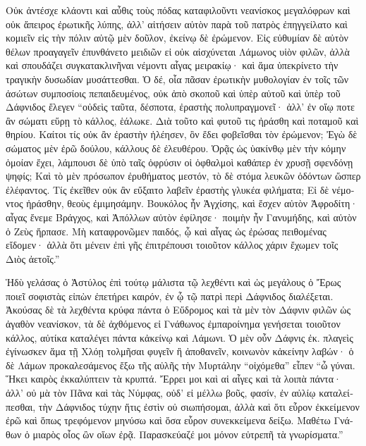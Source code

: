 \documentclass{book}
\begin{document}
\begin{pairs}
\begin{Leftside}
\begin{greek}
  Οὐκ ἀντέσχε κλάοντι καὶ αὖθις τοὺς πόδας καταφιλοῦντι νεανίσκος μεγαλόφρων καὶ οὐκ ἄπειρος ἐρωτικῆς λύπης, ἀλλ’ αἰτήσειν αὐτὸν παρὰ τοῦ πατρὸς ἐπηγγείλατο καὶ κομιεῖν εἰς τὴν πόλιν αὑτῷ μὲν δοῦλον, ἐκείνῳ δὲ ἐρώμενον.  Εἰς εὐθυμίαν δὲ αὐτὸν θέλων προαγαγεῖν ἐπυνθάνετο μειδιῶν εἰ οὐκ αἰσχύνεται Λάμωνος υἱὸν φιλῶν, ἀλλὰ καὶ σπουδάζει συγκατακλινῆναι νέμοντι αἶγας μειρακίῳ· καὶ ἅμα ὑπεκρίνετο τὴν τραγικὴν δυσωδίαν μυσάττεσθαι.  Ὁ δέ, οἷα πᾶσαν ἐρωτικὴν μυθολογίαν ἐν τοῖς τῶν ἀσώτων συμποσίοις πεπαιδευμένος, οὐκ ἀπὸ σκοποῦ καὶ ὑπὲρ αὑτοῦ καὶ ὑπὲρ τοῦ Δάφνιδος ἔλεγεν “οὐδεὶς ταῦτα, δέσποτα, ἐραστὴς πολυπραγμονεῖ· ἀλλ’ ἐν οἵῳ ποτε ἂν σώματι εὕρῃ τὸ κάλλος,  ἑάλωκε. Διὰ τοῦτο καὶ φυτοῦ τις ἠράσθη καὶ ποταμοῦ καὶ θηρίου. Καίτοι τίς οὐκ ἂν ἐραστὴν ἠλέησεν, ὃν ἔδει φοβεῖσθαι τὸν ἐρώμενον; Ἐγὼ δὲ σώματος μὲν ἐρῶ δούλου, κάλλους δὲ ἐλευθέρου.  Ὁρᾷς ὡς ὑακίνθῳ μὲν τὴν κόμην ὁμοίαν ἔχει, λάμπουσι δὲ ὑπὸ ταῖς ὀφρύσιν οἱ ὀφθαλμοὶ καθάπερ ἐν χρυσῇ σφενδόνῃ ψηφίς; Καὶ τὸ μὲν πρόσωπον ἐρυθήματος μεστόν, τὸ δὲ στόμα λευκῶν ὀδόντων ὥσπερ ἐλέφαντος.  Τίς ἐκεῖθεν οὐκ ἂν εὔξαιτο λαβεῖν ἐραστὴς γλυκέα φιλήματα; Εἰ δὲ νέμοντος ἠράσθην, θεοὺς ἐμιμησάμην. Βουκόλος ἦν Ἀγχίσης, καὶ ἔσχεν αὐτὸν Ἀφροδίτη· αἶγας ἔνεμε Βράγχος, καὶ Ἀπόλλων αὐτὸν ἐφίλησε· ποιμὴν ἦν Γανυμήδης, καὶ αὐτὸν ὁ Ζεὺς ἥρπασε.  Μὴ καταφρονῶμεν παιδός, ᾧ καὶ αἶγας ὡς ἐρώσας πειθομένας εἴδομεν· ἀλλὰ ὅτι μένειν ἐπὶ γῆς ἐπιτρέπουσι τοιοῦτον κάλλος χάριν ἔχωμεν τοῖς Διὸς ἀετοῖς.”
\pend


  Ἡδὺ γελάσας ὁ Ἀστύλος ἐπὶ τούτῳ μάλιστα τῷ λεχθέντι καὶ ὡς μεγάλους ὁ Ἔρως ποιεῖ σοφιστὰς εἰπὼν ἐπετήρει καιρόν, ἐν ᾧ τῷ πατρὶ περὶ Δάφνιδος διαλέξεται. Ἀκούσας δὲ τὰ λεχθέντα κρύφα πάντα ὁ Εὔδρομος καὶ τὰ μὲν τὸν Δάφνιν φιλῶν ὡς ἀγαθὸν νεανίσκον, τὰ δὲ ἀχθόμενος εἰ Γνάθωνος ἐμπαροίνημα γενήσεται τοιοῦτον κάλλος, αὐτίκα καταλέγει πάντα κἀκείνῳ καὶ Λάμωνι.  Ὁ μὲν οὖν Δάφνις ἐκ. πλαγεὶς ἐγίνωσκεν ἅμα τῇ Χλόῃ τολμῆσαι φυγεῖν ἢ ἀποθανεῖν, κοινωνὸν κἀκείνην λαβών· ὁ δὲ Λάμων προκαλεσάμενος ἔξω τῆς αὐλῆς τὴν Μυρτάλην “οἰχόμεθα” εἶπεν “ὦ γύναι. Ἥκει καιρὸς ἐκκαλύπτειν τὰ κρυπτά.  Ἔρρει μοι καὶ αἱ αἶγες καὶ τὰ λοιπὰ πάντα· ἀλλ’ οὐ μὰ τὸν Πᾶνα καὶ τὰς Νύμφας, οὐδ’ εἰ μέλλω βοῦς, φασίν, ἐν αὐλίῳ καταλείπεσθαι, τὴν Δάφνιδος τύχην ἥτις ἐστὶν οὐ σιωπήσομαι, ἀλλὰ καὶ ὅτι εὗρον ἐκκείμενον ἐρῶ καὶ ὅπως τρεφόμενον μηνύσω καὶ ὅσα εὗρον συνεκκείμενα δείξω. Μαθέτω Γνάθων ὁ μιαρὸς οἷος ὢν οἵων ἐρᾷ. Παρασκεύαζέ μοι μόνον εὐτρεπῆ τὰ γνωρίσματα.”
\pend



\end{greek}
\end{Leftside}
\end{pairs}
\end{document}
